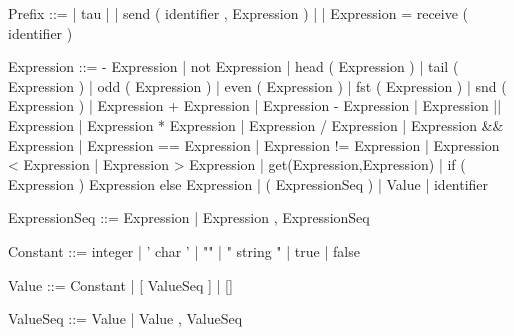 \documentclass[11pt]{report}
\begin{document}
\begin{verbnobox}[\normalfont]
Prefix ::= | tau
         | | send ( identifier , Expression )
         | | Expression = receive ( identifier )
\end{verbnobox}
\vspace*{3pt}

\begin{verbnobox}[\normalfont]
Expression ::= - Expression
               | not Expression
               | head ( Expression )
               | tail ( Expression )
               | odd ( Expression )
               | even ( Expression )
               | fst ( Expression )
               | snd ( Expression )
               | Expression + Expression
               | Expression - Expression
               | Expression || Expression
               | Expression * Expression
               | Expression / Expression
               | Expression && Expression
               | Expression == Expression
               | Expression != Expression 
               | Expression < Expression
               | Expression > Expression
               | get(Expression,Expression)
               | if ( Expression ) { Expression } else { Expression }
               | ( ExpressionSeq )
               | Value
               | identifier
\end{verbnobox}
\vspace*{3pt}

\begin{verbnobox}[\normalfont]
ExpressionSeq ::= Expression | Expression , ExpressionSeq
\end{verbnobox}
\vspace*{3pt}

\begin{verbnobox}[\normalfont]
Constant ::= integer
             | ' char '
             | ""
             | " string "
             | true
             | false
\end{verbnobox}
\vspace*{3pt}

\begin{verbnobox}[\normalfont]
Value ::= Constant | [ ValueSeq ] | []
\end{verbnobox}
\vspace*{3pt}

\begin{verbnobox}[\normalfont]
ValueSeq ::= Value | Value , ValueSeq
\end{verbnobox}
\vspace*{3pt}
\end{document}
